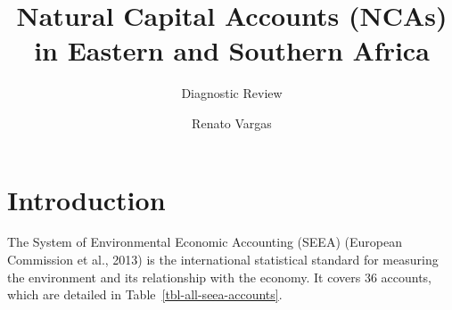 \documentclass[
  letterpaper,
  DIV=11,
  numbers=noendperiod]{scrartcl}
\title{Natural Capital Accounts (NCAs) in Eastern and Southern Africa}
\subtitle{Diagnostic Review}
\author{Renato Vargas}
\date{}
\renewcommand*\contentsname{Table of contents}
\newcommand\contentsname{Table of contents}
\begin{document}
\maketitle

\renewcommand*\contentsname{Table of contents}
{
\setcounter{tocdepth}{3}
\tableofcontents
}

\section{Introduction}\label{introduction}

The System of Environmental Economic Accounting (SEEA) (European
Commission et al., 2013) is the international statistical standard for
measuring the environment and its relationship with the economy. It
covers 36 accounts, which are detailed in
Table~\ref{tbl-all-seea-accounts}.
\end{document}
